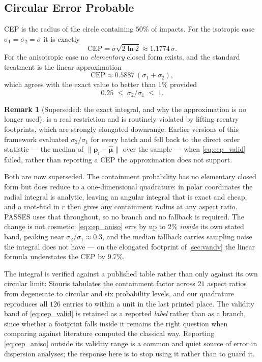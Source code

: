 \documentclass[11pt,a4paper]{article}
\theoremstyle{definition}
\newtheorem{remark}[theorem]{Remark}
\numberwithin{equation}{section}
\begin{document}
\subsection{Circular Error Probable}

CEP is the radius of the circle containing $50\%$ of impacts. For the isotropic case $\sigma_1 = \sigma_2 = \sigma$ it is exactly
\begin{equation}
\label{eq:cep_iso}
\text{CEP} = \sigma\sqrt{2\ln 2} \approx 1.1774\,\sigma .
\end{equation}
For the anisotropic case no \emph{elementary} closed form exists, and the standard treatment is the linear approximation
\begin{equation}
\label{eq:cep_aniso}
\text{CEP} \approx 0.5887\,(\sigma_1 + \sigma_2),
\end{equation}
which agrees with the exact value to better than $1\%$ provided
\begin{equation}
\label{eq:cep_valid}
0.25 \;\le\; \sigma_2/\sigma_1 \;\le\; 1 .
\end{equation}

\begin{remark}[Superseded: the exact integral, and why the approximation is no longer used]
\label{rem:cepvalid}
 is a real restriction and is routinely violated by lifting reentry footprints, which are strongly elongated downrange. Earlier versions of this framework evaluated $\sigma_2/\sigma_1$ for every batch and fell back to the direct order statistic --- the median of $\|\mathbf{p}_i - \hat{\bm{\mu}}\|$ over the sample --- when \cref{eq:cep_valid} failed, rather than reporting a CEP the approximation does not support.

Both are now superseded. The containment probability has no elementary closed form but does reduce to a one-dimensional quadrature: in polar coordinates the radial integral is analytic, leaving an angular integral that is exact and cheap, and a root-find in $r$ then gives any containment radius at any aspect ratio. PASSES uses that throughout, so no branch and no fallback is required. The change is not cosmetic: \cref{eq:cep_aniso} errs by up to $2\%$ \emph{inside} its own stated band, peaking near $\sigma_2/\sigma_1 \approx 0.3$, and the median fallback carries sampling noise the integral does not have --- on the elongated footprint of \cref{sec:vandv} the linear formula understates the CEP by $9.7\%$.

The integral is verified against a published table rather than only against its own circular limit: Siouris \cite[Table 5.2]{siouris2004} tabulates the containment factor across $21$ aspect ratios from degenerate to circular and six probability levels, and our quadrature reproduces all $126$ entries to within a unit in the last printed place. The validity band of \cref{eq:cep_valid} is retained as a reported \emph{label} rather than as a branch, since whether a footprint falls inside it remains the right question when comparing against literature computed the classical way. Reporting \cref{eq:cep_aniso} outside its validity range is a common and quiet source of error in dispersion analyses; the response here is to stop using it rather than to guard it.
\end{remark}
\end{document}
